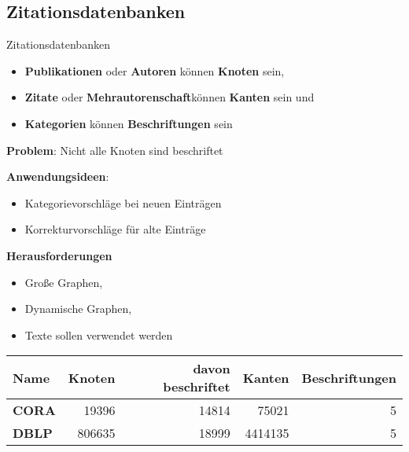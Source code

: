 \subsection{Zitationsdatenbanken}
\begin{frame}{Zitationsdatenbanken}
    \begin{itemize}
        \item \textbf{Publikationen} oder \textbf{Autoren} können \textbf{Knoten} sein,
        \item \textbf{Zitate} oder \textbf{Mehrautorenschaft}können \textbf{Kanten} sein und
        \item \textbf{Kategorien} können \textbf{Beschriftungen} sein
    \end{itemize}

    \textbf{Problem}: Nicht alle Knoten sind beschriftet

    \textbf{Anwendungsideen}:
    \begin{itemize}
        \item Kategorievorschläge bei neuen Einträgen
        \item Korrekturvorschläge für alte Einträge
    \end{itemize}
\end{frame}

\begin{frame}{}
    \textbf{Herausforderungen}
    \begin{itemize}
        \item Große Graphen,
        \item Dynamische Graphen,
        \item Texte sollen verwendet werden
    \end{itemize}

    \begin{table}
        \begin{tabular}{|l||r|r|r|r|}\hline
        \textbf{Name} & \textbf{Knoten} & \textbf{davon beschriftet} & \textbf{Kanten}  & \textbf{Beschriftungen} \\ \hline\hline
        \textbf{CORA} & \num{19396}  & \num{14814}             & \num{75021}   & 5              \\
        \textbf{DBLP} & \num{806635} & \num{18999 }            & \num{4414135} & 5              \\\hline
        \end{tabular}
    \end{table}

\end{frame}

